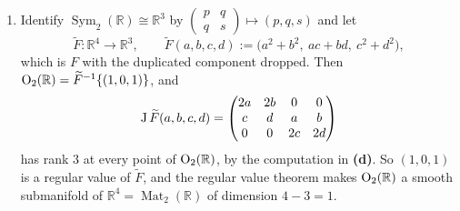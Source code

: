 \begin{exercisesolution}
\begin{enumerate}[label=\textbf{(\alph*)}]
    This is why \cref{thm:regular_value_theorem} cannot be applied to $F$ as a map
    $\mathbb{R}^4 \to \mathbb{R}^4$: the theorem needs $D_AF$ to be \emph{surjective}, that is of
    rank $4$, and the rank is $3$ at every point of $\Orth_2(\mathbb{R})$. Nor is this a defect of
    the particular level: by \textbf{(b)} the image of $F$ lies in a three-dimensional subspace, so
    $D_AF$ is nowhere surjective, for any $A$ whatsoever.

  \item Identify $\operatorname{Sym}_2(\mathbb{R}) \cong \mathbb{R}^3$ by
    $\left(\begin{smallmatrix} p & q \\ q & s\end{smallmatrix}\right) \mapsto (p,q,s)$ and let
\[\widetilde F : \mathbb{R}^4 \to \mathbb{R}^3, \qquad
  \widetilde F(a,b,c,d) := \big(a^2+b^2,\ ac+bd,\ c^2+d^2\big),\]
    which is $F$ with the duplicated component dropped. Then
    $\operatorname{O}_2(\mathbb{R}) = \widetilde F^{-1}\{(1,0,1)\}$, and
\[\operatorname{J} \widetilde F(a,b,c,d) = \begin{pmatrix}
  2a & 2b & 0 & 0 \\
  c & d & a & b \\
  0 & 0 & 2c & 2d
\end{pmatrix}\]
    has rank $3$ at every point of $\Orth_2(\mathbb{R})$, by the computation in \textbf{(d)}. So
    $(1,0,1)$ is a regular value of $\widetilde F$, and the regular value theorem makes
    $\Orth_2(\mathbb{R})$ a smooth submanifold of $\mathbb{R}^4 = \operatorname{Mat}_2(\mathbb{R})$
    of dimension $4 - 3 = 1$.


\end{enumerate}
\end{exercisesolution}
